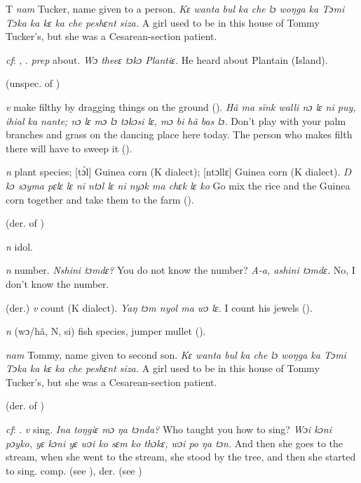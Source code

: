 \begin{letter}{T}
 \textit{nam} Tucker, name given to a person. \textit{Kɛ wanta bul ka che lɔ woŋga ka Tɔmi Tɔka ka kɛ ka che peshɛnt siza.} A girl used to be in this house of Tommy Tucker's, but she was a Cesarean-section patient.

 \textit{cf}: , . \textit{prep} about. \textit{Wɔ theeɛ tɔkɔ Plantiɛ.} He heard about Plantain (Island).

 (unspec. of ) 

 \textit{v} make filthy by dragging things on the ground (\citealt{Pichl1967}). \textit{Hã ma sïnk walli nɔ lɛ ni puy, ihial ka nante; nɔ lɛ mɔ lɔ tɔkɔsi lɛ, mɔ bi hã bas lɔ.} Don't play with your palm branches and grass on the dancing place here today. The person who makes filth there will have to sweep it (\citealt{Pichl1967}). 

 \textit{n} plant species; [tɔ̀l] Guinea corn (K dialect); [ntɔllɛ] Guinea corn (K dialect). \textit{Ŋ kɔ sɔyma pɛlɛ lɛ ni ntɔl lɛ ni nyɔk ma chɛk lɛ ko} Go mix the rice and the Guinea corn together and take them to the farm (\citealt{Pichl1967}). 

 (der. of ) 

 \textit{n} idol.

 \textit{n} number. \textit{Nshini tɔmdɛ?} You do not know the number? \textit{A-a, ashini tɔmdɛ.} No, I don't know the number.

 (der.) \textit{v} count (K dialect). \textit{Yaŋ tɔm nyol ma wɔ lɛ.} I count his jewels (\citealt{Pichl1967}). 

 \textit{n} (wɔ/hã, N, si) fish species, jumper mullet (\citealt{Pichl1967}). 

 \textit{nam} Tommy, name given to second son. \textit{Kɛ wanta bul ka che lɔ woŋga ka Tɔmi Tɔka ka kɛ ka che peshɛnt siza.} A girl used to be in this house of Tommy Tucker's, but she was a Cesarean-section patient. 

 (der. of ) 

 \textit{cf}: . \textit{v} sing. \textit{Ina toŋgiɛ mɔ ŋa tɔnda?} Who taught you how to sing? \textit{Wɔi kɔni pɔyko, yɛ kɔni yɛ wɔi ko sɛm ko thɔkɛ, wɔi po ŋa tɔn.} And then she goes to the stream, when she went to the stream, she stood by the tree, and then she started to sing. comp.  (see ), der.  (see ) 


\end{letter}
